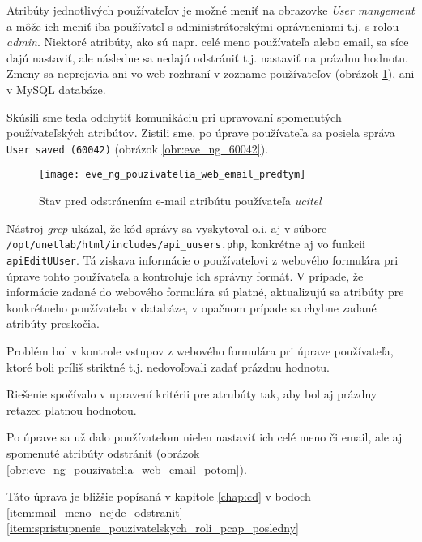 Atribúty jednotlivých používateľov je možné meniť na obrazovke \emph{User mangement} a môže ich meniť iba používateľ s administrátorskými oprávneniami t.j. s rolou \emph{admin}. Niektoré atribúty, ako sú napr. celé meno používateľa alebo email, sa síce dajú nastaviť, ale následne sa nedajú odstrániť t.j. nastaviť na prázdnu hodnotu. Zmeny sa neprejavia ani vo web rozhraní v zozname používateľov (obrázok \ref{obr:eve_ng_pouzivatelia_web_email_predtym}), ani v MySQL databáze.

\begin{figure}
    
\end{figure}

Skúsili sme teda odchytiť komunikáciu pri upravovaní spomenutých používateľských atribútov. Zistili sme, po úprave používateľa sa posiela správa \texttt{User saved (60042)} (obrázok \ref{obr:eve_ng_60042}).

\begin{figure}
    \centering
    \texttt{[image: eve\_ng\_pouzivatelia\_web\_email\_predtym]}
    \caption{Stav pred odstránením e-mail atribútu používateľa \emph{ucitel}}
    \label{obr:eve_ng_pouzivatelia_web_email_predtym}
\end{figure}

Nástroj \emph{grep} ukázal, že kód správy sa vyskytoval o.i. aj v súbore \\
\texttt{/opt/unetlab/html/includes/api\_uusers.php}, konkrétne aj vo funkcii \texttt{apiEditUUser}. Tá ziskava informácie o používateľovi z webového formulára pri úprave tohto používateľa a kontroluje ich správny formát. V prípade, že informácie zadané do webového formulára sú platné, aktualizujú sa atribúty pre konkrétneho používateľa v databáze, v opačnom prípade sa chybne zadané atribúty preskočia.

Problém bol v kontrole vstupov z webového formulára pri úprave používateľa, ktoré boli príliš striktné t.j. nedovoľovali zadať prázdnu hodnotu.

Riešenie spočívalo v upravení kritérii pre atrubúty tak, aby bol aj prázdny reťazec platnou hodnotou.

Po úprave sa už dalo používateľom nielen nastaviť ich celé meno či email, ale aj spomenuté atribúty odstrániť (obrázok \ref{obr:eve_ng_pouzivatelia_web_email_potom}).

Táto úprava je bližšie popísaná v kapitole \ref{chap:cd} v bodoch \ref{item:mail_meno_nejde_odstranit}-\ref{item:spristupnenie_pouzivatelskych_roli_pcap_posledny}

